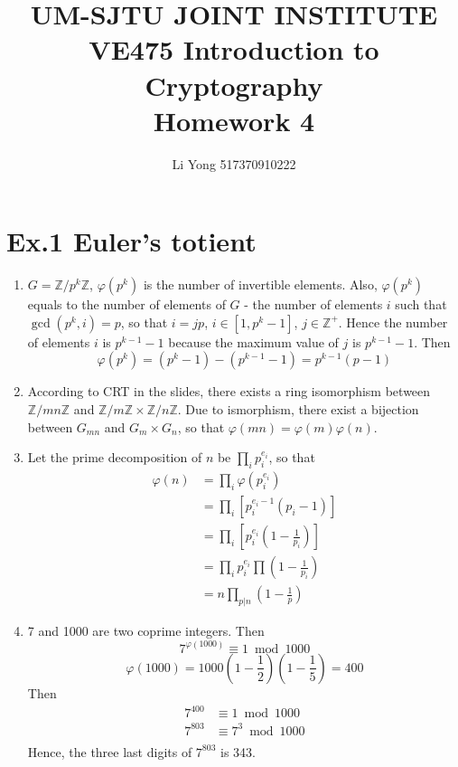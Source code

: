 \documentclass[a4paper]{article}
\title{UM-SJTU JOINT INSTITUTE\\VE475 Introduction to Cryptography\\\vspace{0.5cm} Homework 4}
\author{Li Yong 517370910222}
\begin{document}
\maketitle
\newpage

\section*{Ex.1 Euler’s totient}
	\begin{enumerate}
		\item $G = \mathbb{Z}/p^k\mathbb{Z}$, $\varphi(p^k)$ is the number of invertible elements. Also, $\varphi(p^k)$ equals to the number of elements of $G$ - the number of elements $i$ such that $\gcd(p^k, i) = p$, so that $i = jp$, $i \in [1, p^k - 1]$, $j \in \mathbb{Z}^+$. Hence the number of elements $i$ is $p^{k-1} - 1$ because the maximum value of $j$ is $p^{k-1} - 1$. Then
		$$\varphi(p^k) = (p^k - 1) - (p^{k-1} - 1) = p^{k - 1}(p - 1)$$

		\item According to CRT in the slides, there exists a ring isomorphism between $\mathbb{Z}/mn\mathbb{Z}$ and $\mathbb{Z}/m\mathbb{Z} \times \mathbb{Z}/n\mathbb{Z}$. Due to ismorphism, there exist a bijection between $G_{mn}$ and $G_m\times G_n$, so that $\varphi(mn) = \varphi(m)\varphi(n)$.

		\item Let the prime decomposition of $n$ be $\prod_i p_i^{e_i}$, so that
		\[
		\begin{aligned}
			\varphi(n) &= \prod_i \varphi(p_i^{e_i}) \\
			&= \prod_i [p_i^{e_i - 1}(p_i - 1)] \\
			&= \prod_i \left[p_i^{e_i}\left(1 - \frac{1}{p_i} \right)\right]\\
			&= \prod_i p_i^{e_i} \prod\left(1 - \frac{1}{p_i} \right)\\
			&= n\prod_{p|n}\left(1 - \frac{1}{p} \right)
		\end{aligned}
		\]

		\item 7 and 1000 are two coprime integers. Then
		$$7^{\varphi(1000)} \equiv 1 \bmod 1000$$
		$$\varphi(1000) = 1000\left(1 - \frac{1}{2} \right)\left(1 - \frac{1}{5}\right) = 400$$
		Then
		\[
		\begin{aligned}
			7^{400} &\equiv 1 \bmod 1000 \\
			7^{803} &\equiv 7^3 \bmod 1000 \\
		\end{aligned}
		\]
		Hence, the three last digits of $7^{803}$ is 343.
	\end{enumerate}
\end{document}
